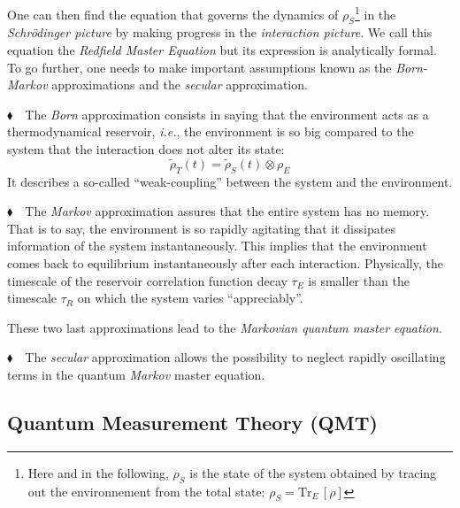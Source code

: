 One can then find the equation that governs the dynamics of $\rho_S$\footnote{Here and in the following, $\rho_S$ is the state of the system obtained by tracing out the environnement from the total state: $\rho_S=\mathrm{Tr}_E\, [\rho]$} in the \textit{Schrödinger picture} by making progress in the \textit{interaction picture}. We call this equation the \textit{Redfield Master Equation} but its expression is analytically formal. To go further, one needs to make important assumptions known as the \textit{Born-Markov} approximations and the \textit{secular} approximation.\par
\newpage
$\blacklozenge\quad$The \textit{Born} approximation consists in saying that the environment acts as a thermodynamical reservoir, \textit{i.e.}, the environment is so big compared to the system that the interaction does not alter its state:
\begin{equation}
    \tilde{\rho}_T(t) = \tilde{\rho}_S(t)\otimes\rho_E
\end{equation}
It describes a so-called ``weak-coupling'' between the system and the environment.\par

$\blacklozenge\quad$The \textit{Markov} approximation assures that the entire system has no memory. That is to say, the environment is so rapidly agitating that it dissipates information of the system instantaneously. This implies that the environment comes back to equilibrium instantaneously after each interaction. Physically, the timescale of the reservoir correlation function decay $\tau_E$ is smaller than the timescale $\tau_R$ on which the system varies ``appreciably''.\par %
These two last approximations lead to the \textit{Markovian quantum master equation}.\par
$\blacklozenge\quad$The \textit{secular} approximation allows the possibility to neglect rapidly oscillating terms in the quantum \textit{Markov} master equation.

\subsection[Quantum measurement theory]{Quantum Measurement Theory (QMT)}

